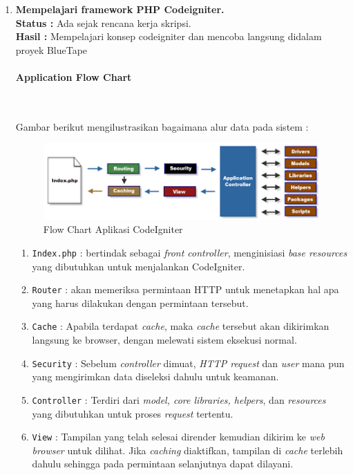 \documentclass[a4paper,twoside]{article}
\newcommand{\myparagraph}[1]{\paragraph{#1}\mbox{}\\}
\begin{document}
	\begin{enumerate}
		\item \textbf{Mempelajari framework PHP Codeigniter.}\\
		{\bf Status :} Ada sejak rencana kerja skripsi.\\
		{\bf Hasil :} Mempelajari konsep codeigniter dan mencoba langsung didalam proyek BlueTape \par
		\myparagraph{Application Flow Chart} \par
		Gambar berikut mengilustrasikan bagaimana alur data pada sistem :
		
		\begin{figure} [H]
			\centering  
			\includegraphics[scale=1.0]{appflowchart.png}  
			\caption{Flow Chart Aplikasi CodeIgniter}
			\label{fig:flow-chart-CodeIgniter} 
		\end{figure}
		
		\begin{enumerate}
			\item \texttt{Index.php} : bertindak sebagai \textit{front controller}, menginisiasi \textit{base resources} yang dibutuhkan untuk menjalankan CodeIgniter.
			\item \texttt{Router} : akan memeriksa permintaan HTTP untuk menetapkan hal apa yang harus dilakukan dengan permintaan tersebut.
			\item \texttt{Cache} : Apabila terdapat \textit{cache}, maka \textit{cache} tersebut akan dikirimkan langsung ke browser, dengan melewati sistem eksekusi normal.
			\item \texttt{Security} : Sebelum \textit{controller} dimuat, \textit{HTTP request} dan \textit{user} mana pun yang mengirimkan data diseleksi dahulu untuk keamanan.
			\item \texttt{Controller} : Terdiri dari \textit{model, core libraries, helpers}, dan \textit{resources} yang dibutuhkan untuk proses \textit{request} tertentu.
			\item \texttt{View} : Tampilan yang telah selesai dirender kemudian dikirim ke \textit{web browser} untuk dilihat. Jika \textit{caching} diaktifkan, tampilan di \textit{cache} terlebih dahulu sehingga pada permintaan selanjutnya dapat dilayani.\cite{codeigniter}
		\end{enumerate}
		

\end{enumerate}
\end{document}
